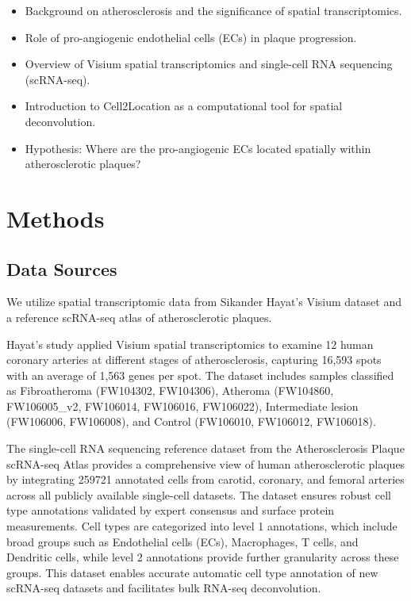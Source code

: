\documentclass[a4paper,12pt]{article}
\begin{document}
\begin{itemize}
  \item Background on atherosclerosis and the significance of spatial transcriptomics.
  \item Role of pro-angiogenic endothelial cells (ECs) in plaque progression.
  \item Overview of Visium spatial transcriptomics and single-cell RNA sequencing (scRNA-seq).
  \item Introduction to Cell2Location as a computational tool for spatial deconvolution.
  \item Hypothesis: Where are the pro-angiogenic ECs located spatially within atherosclerotic plaques?
\end{itemize}


\section{Methods}
\subsection{Data Sources}
We utilize spatial transcriptomic data from Sikander Hayat’s Visium dataset and a reference scRNA-seq atlas of atherosclerotic plaques.

Hayat’s study applied Visium spatial transcriptomics to examine 12 human coronary arteries at different stages of atherosclerosis, capturing 16,593 spots with an average of 1,563 genes per spot. The dataset includes samples classified as Fibroatheroma (FW104302, FW104306), Atheroma (FW104860, FW106005\_v2, FW106014, FW106016, FW106022), Intermediate lesion (FW106006, FW106008), and Control (FW106010, FW106012, FW106018).

The single-cell RNA sequencing reference dataset from the Atherosclerosis Plaque scRNA-seq Atlas provides a comprehensive view of human atherosclerotic plaques by integrating %
259721
 annotated cells from carotid, coronary, and femoral arteries across all publicly available single-cell datasets. The dataset ensures robust cell type annotations validated by expert consensus and surface protein measurements. Cell types are categorized into level 1 annotations, which include broad groups such as Endothelial cells (ECs), Macrophages, T cells, and Dendritic cells, while level 2 annotations provide further granularity across these groups. This dataset enables accurate automatic cell type annotation of new scRNA-seq datasets and facilitates bulk RNA-seq deconvolution.
\end{document}
